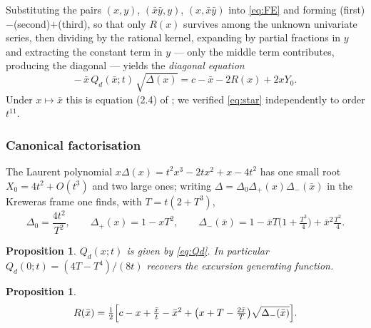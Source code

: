 \documentclass[11pt]{article}
\newtheorem{proposition}[theorem]{Proposition}
\theoremstyle{definition}
\newcommand{\bx}{\bar x}\newcommand{\by}{\bar y}
\begin{document}
Substituting the pairs $(x,y)$, $(\bx\by,y)$, $(x,\bx\by)$ into \eqref{eq:FE}
and forming (first)$-$(second)$+$(third), so that only $R(x)$ survives among
the unknown univariate series, then dividing by the rational kernel, expanding
by partial fractions in $y$ and extracting the constant term in $y$ --- only
the middle term contributes, producing the diagonal --- yields the
\emph{diagonal equation}
\begin{equation}\label{eq:star}
  -\,\bx\,Q_d(\bx;t)\,\sqrt{\Delta(x)}=c-\bx-2R(x)+2xY_0 .
\end{equation}
Under $x\mapsto\bx$ this is equation (2.4) of \cite{Mishna}; we verified
\eqref{eq:star} independently to order $t^{11}$.

\subsubsection*{Canonical factorisation}

The Laurent polynomial $x\Delta(x)=t^{2}x^{3}-2tx^{2}+x-4t^{2}$ has one small
root $X_0=4t^{2}+O(t^{3})$ and two large ones; writing
$\Delta=\Delta_0\Delta_+(x)\Delta_-(\bx)$ in the Kreweras frame one finds, with
$T=t(2+T^{3})$,
\[
  \Delta_0=\frac{4t^{2}}{T^{2}},\qquad
  \Delta_+(x)=1-xT^{2},\qquad
  \Delta_-(\bx)=1-\bx T\bigl(1+\tfrac{T^{3}}{4}\bigr)+\bx^{2}\tfrac{T^{2}}{4}.
\]

\begin{proposition}\label{prop:Qd}
$Q_d(x;t)$ is given by \eqref{eq:Qd}. In particular
$Q_d(0;t)=(4T-T^{4})/(8t)$ recovers the excursion generating function.
\end{proposition}

\begin{proposition}\label{prop:R}
\[
  R(\bx)=\tfrac12\Bigl[c-x+\tfrac{\bx}{t}-\bx^{2}
   +\bigl(x+T-\tfrac{2\bx}{T}\bigr)\sqrt{\Delta_-(\bx)}\Bigr].
\]
\end{proposition}
\end{document}
